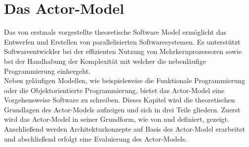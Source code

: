 \chapter{Das Actor-Model} \label{actor:chapter}
Das von \cite{hewitt1973session} erstmals vorgestellte theoretische Software Model ermöglicht das Entwerfen und Erstellen von parallelisierten Softwaresystemen. Es unterstützt Softwareentwickler bei der effizienten Nutzung von Mehrkernprozessoren sowie bei der Handhabung der Komplexität mit welcher die nebenläufige Programmierung einhergeht.  
\\
Neben geläufigen Modellen, wie beispielsweise die Funktionale Programmierung oder die Objektorientierte Programmierung, bietet das Actor-Model eine Vorgehensweise Software zu schreiben. Dieses Kapitel wird die theoretischen Grundlagen des Actor-Models aufzeigen und sich in drei Teile gliedern. Zuerst wird das Actor-Model in seiner Grundform, wie von \cite{hewitt1973session} und \cite{Agha1985ActorsSystems} definiert, gezeigt. Anschließend werden Architekturkonzepte auf Basis des Actor-Model erarbeitet und abschließend erfolgt eine Evaluierung des Actor-Models.


